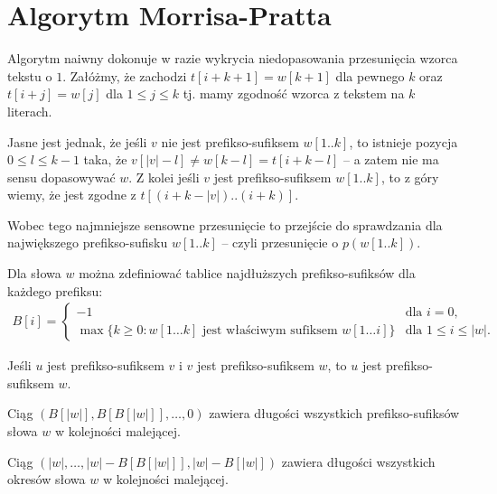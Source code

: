 \section{Algorytm Morrisa-Pratta}

Algorytm naiwny dokonuje w razie wykrycia niedopasowania przesunięcia wzorca tekstu o $1$.
Załóżmy, że zachodzi $t[i + k + 1] = w[k + 1]$ dla pewnego $k$ oraz $t[i + j] = w[j]$ dla $1 \le j \le k$ tj. mamy zgodność wzorca z tekstem na $k$ literach.

Jasne jest jednak, że jeśli $v$ nie jest prefikso-sufiksem $w[1..k]$, to istnieje pozycja $0 \le l \le k - 1$ taka, że $v[|v| - l] \neq w[k - l] = t[i + k - l]$ -- a zatem nie ma sensu dopasowywać $w$. Z kolei jeśli $v$ jest prefikso-sufiksem $w[1..k]$, to z góry wiemy, że jest zgodne z $t[(i + k - |v|)..(i + k)]$.

Wobec tego najmniejsze sensowne przesunięcie to przejście do sprawdzania dla największego prefikso-sufisku $w[1..k]$ -- czyli przesunięcie o $p(w[1..k])$.

Dla słowa $w$ można zdefiniować tablice najdłuższych prefikso-sufiksów dla każdego prefiksu:
\begin{align*}
  B[i] = 
  \begin{cases}
    -1 & \text{dla $i = 0$,} \\
    \max\{k \ge 0:\text{$w[1 \ldots k]$ jest właściwym sufiksem $w[1\ldots i]$}\} & \text{dla $1 \le i \le |w|$.}
  \end{cases}
\end{align*}

\begin{lemma}{}{}
  \label{lem:pref-suf}
  Jeśli $u$ jest prefikso-sufiksem $v$ i $v$ jest prefikso-sufiksem $w$, to $u$ jest prefikso-sufiksem $w$.
\end{lemma}

\begin{corollary}{}{}
  Ciąg $(B[|w|], B[B[|w|]], \ldots, 0)$ zawiera długości wszystkich prefikso-sufiksów słowa $w$ w kolejności malejącej.
\end{corollary}

\begin{corollary}{}{}
  Ciąg $(|w|, \ldots, |w| - B[B[|w|]], |w| - B[|w|])$ zawiera długości wszystkich okresów słowa $w$ w kolejności malejącej.
\end{corollary}

\begin{code}
\inputminted{python}{code/other/prefix-suffix.py}
\label{alg:prefix-suffix}
\end{code}

